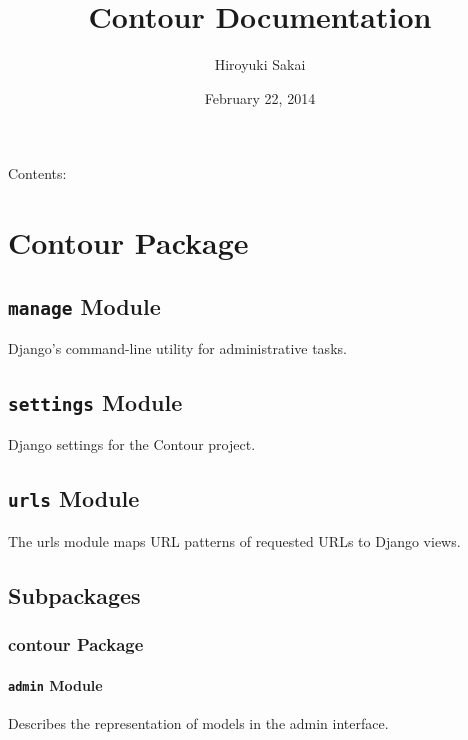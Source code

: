 \documentclass[letterpaper,10pt,english]{sphinxmanual}
\title{Contour Documentation}
\date{February 22, 2014}
\author{Hiroyuki Sakai}
\begin{document}
\maketitle
\tableofcontents
{}\label{index::doc}


Contents:


\chapter{Contour Package}
\label{Contour:welcome-to-contour-s-documentation}\label{Contour:contour-package}\label{Contour::doc}

\section{\texttt{manage} Module}
\label{Contour:manage-module}\label{Contour:module-Contour.manage}
Django's command-line utility for administrative tasks.


\section{\texttt{settings} Module}
\label{Contour:module-Contour.settings}\label{Contour:settings-module}
Django settings for the Contour project.


\section{\texttt{urls} Module}
\label{Contour:module-Contour.urls}\label{Contour:urls-module}
The urls module maps URL patterns of requested URLs to Django views.


\section{Subpackages}
\label{Contour:subpackages}

\subsection{contour Package}
\label{Contour.contour:contour-package}\label{Contour.contour::doc}

\subsubsection{\texttt{admin} Module}
\label{Contour.contour:admin-module}\label{Contour.contour:module-Contour.contour.admin}
Describes the representation of models in the admin interface.
\end{document}
